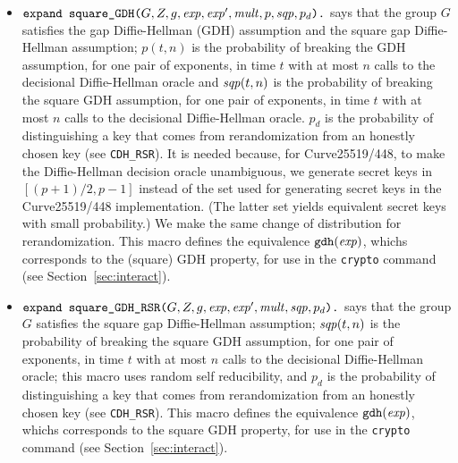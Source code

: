 \documentclass{article}
\begin{document}
\begin{itemize}
\begin{itemize}
\begin{itemize}
     \item
       $\texttt{expand\ square\_GDH(}G, Z, g, \mathit{exp}, \mathit{exp}',
       \mathit{mult}, p, \mathit{sqp},p_d\texttt{).}$ says that the group $G$
       satisfies the gap Diffie-Hellman (GDH) assumption and the
       square gap Diffie-Hellman assumption; $p(t,n)$ is the
       probability of breaking the GDH assumption, for one pair of
       exponents, in time $t$ with at most $n$ calls to the decisional
       Diffie-Hellman oracle and $\mathit{sqp}(t,n)$ is the probability of
       breaking the square GDH assumption, for one pair of exponents,
       in time $t$ with at most $n$ calls to the decisional
       Diffie-Hellman oracle.  $p_d$ is the probability of
       distinguishing a key that comes from rerandomization from an
       honestly chosen key (see \texttt{CDH\_RSR}). It is needed
       because, for Curve25519/448, to make the Diffie-Hellman
       decision oracle unambiguous, we generate secret keys in
       $[(p+1)/2,p-1]$ instead of the set used for generating secret
       keys in the Curve25519/448 implementation.  (The latter set
       yields equivalent secret keys with small probability.) We make
       the same change of distribution for rerandomization. This
       macro defines the equivalence $\texttt{gdh}(\mathit{exp})$, whichs
       corresponds to the (square) GDH property, for use in the
       \texttt{crypto} command (see Section~\ref{sec:interact}).

     \item $\texttt{expand\ square\_GDH\_RSR(}G, Z, g, \mathit{exp},
       \mathit{exp}', \mathit{mult}, \mathit{sqp}, p_d\texttt{).}$ says that the group
       $G$ satisfies the square gap Diffie-Hellman assumption;
       $\mathit{sqp}(t,n)$ is the probability of breaking the square GDH
       assumption, for one pair of exponents, in time $t$ with at most
       $n$ calls to the decisional Diffie-Hellman oracle; this macro
       uses random self reducibility, and $p_d$ is the probability of
       distinguishing a key that comes from rerandomization from an
       honestly chosen key (see \texttt{CDH\_RSR}).  This macro
       defines the equivalence $\texttt{gdh}(\mathit{exp})$, whichs
       corresponds to the square GDH property, for use in the
       \texttt{crypto} command (see Section~\ref{sec:interact}).


\end{itemize}
\end{itemize}
\end{itemize}
\end{document}
